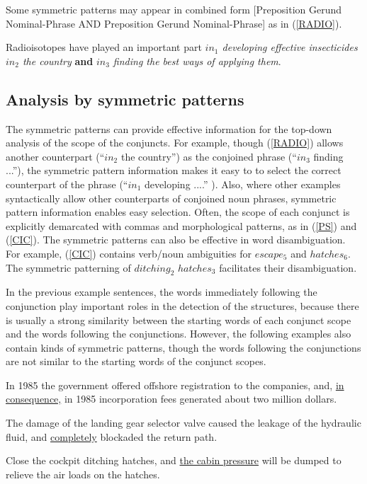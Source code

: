 Some symmetric patterns may appear in combined form 
[Preposition Gerund Nominal-Phrase AND Preposition Gerund
Nominal-Phrase] as in (\ref{RADIO}). 
  \mylistin
    \item Radioisotopes have played an important part {\sl $in_{1}$
developing effective insecticides $in_{2}$ the country} {\bf and} {\sl
$in_{3}$ finding the best ways of applying them}. \label{RADIO}
  \mylistend

\subsection{Analysis by symmetric patterns} \label{NEAR}

The symmetric patterns can provide effective information for the
top-down analysis of the scope of the conjuncts.  For example, though (\ref{RADIO})
allows another counterpart (``$in_{2}$ the country'') as the conjoined
phrase (``$in_{3}$ finding ...''), the symmetric pattern information
makes it easy to to select the correct counterpart of the phrase
(``$in_{1}$ developing ....'' ).  Also, where other examples syntactically
allow other counterparts of conjoined noun phrases, symmetric
pattern information enables easy selection.
Often, the scope of each conjunct is explicitly demarcated with commas and
morphological patterns, as in (\ref{PS}) and (\ref{CIC}).
The symmetric patterns can also be effective in
word disambiguation.  For example, (\ref{CIC}) contains verb/noun
ambiguities for $escape_{5}$ and $hatches_{6}$.  The
symmetric patterning of \underline{$ditching_{2}$}
  \underline{$hatches_{3}$} facilitates their disambiguation. 

In the previous example sentences, the words immediately following the
conjunction play important roles in the detection of the structures, because
there is usually a strong similarity between the starting words of each
conjunct scope and the words following the conjunctions.
However, the following examples also contain
kinds of symmetric patterns,
though the words following the conjunctions are not similar to
the starting words of the conjunct scopes.
\mylistin
\item  In 1985 the government offered offshore registration to the
companies, and, \underline{in consequence,} in 1985 incorporation fees
generated about two million dollars. \label{CONSEQUENCE}
\item The damage of the landing gear selector valve caused the
      leakage of the hydraulic fluid, and \underline{completely}
      blockaded the return path.
\label{COMPLETELY}
\item Close the cockpit ditching hatches, and \underline{the cabin
     pressure} will be dumped to relieve the air loads on the hatches.
\label{IMPERATIVE}
\mylistend

